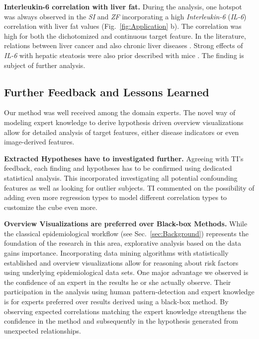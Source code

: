\documentclass[journal]{style/vgtc} 			          %
\newcommand{\com}[1]{\textcolor{orange}{\uline{#1}}}
\begin{document}
\textbf{Interleukin-6 correlation with liver fat.}
During the analysis, one hotspot was always observed in the \emph{SI} and \emph{ZF} incorporating a high \emph{Interleukin-6} (\emph{IL-6}) correlation with liver fat values (Fig.~\ref{fig:Application} b).
The correlation was high for both the dichotomized and continuous target feature.
In the literature, relations between liver cancer \cite{He2013} and also chronic liver diseases \cite{Streetz2003}.
Strong effects of \emph{IL-6} with hepatic steatosis were also prior described with mice \cite{Hong2004}.
The finding is subject of further analysis.
\subsection{Further Feedback and Lessons Learned} \label{Lessons Learned}
Our method was well received among the domain experts.
The novel way of modeling expert knowledge to derive hypothesis driven overview visualizations allow for detailed analysis of target features, either disease indicators or even image-derived features.

\textbf{Extracted Hypotheses have to investigated further.}
Agreeing with TI's feedback, each finding and hypotheses has to be confirmed using dedicated statistical analysis.
This incorporated investigating all potential confounding features as well as looking for outlier subjects.
TI commented on the possibility of adding even more regression types to model different correlation types to customize the cube even more.

\textbf{Overview Visualizations are preferred over Black-box Methods.}
While the classical epidemiological workflow (see Sec.~\ref{sec:Background}) represents the foundation of the research in this area, explorative analysis based on the data gains importance.
Incorporating data mining algorithms with statistically established and overview visualizations allow for reasoning about risk factors using underlying epidemiological data sets.
One major advantage we observed is the confidence of an expert in the results he or she actually observe.
Their participation in the analysis using human pattern-detection and expert knowledge is for experts preferred over results derived using a black-box method.
By observing expected correlations matching the expert knowledge strengthens the confidence in the method and subsequently in the hypothesis generated from unexpected relationships.
\end{document}
